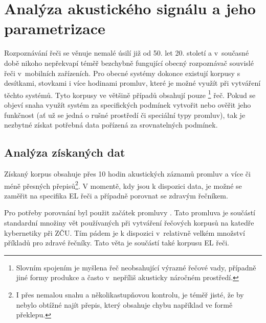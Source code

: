 \section{Analýza akustického signálu a jeho parametrizace}
\label{chap:construction:analysis}

Rozpoznávání řeči se věnuje nemalé úsilí již od 50. let 20. století a v~současné době nikoho nepřekvapí téměř bezchybně fungující obecný rozpoznávač souvislé řeči v~mobilních zařízeních.
Pro obecné systémy dokonce existují korpusy s desítkami, stovkami i více hodinami promluv, které je možné využít při vytváření těchto systémů.
Tyto korpusy ve většině případů obsahují pouze \footnote{Slovním spojením  je myšlena řeč neobsahující výrazné řečové vady, případně jiné formy produkce a často v~nepříliš akusticky náročném prostředí.} řeč.
Pokud se objeví snaha využít systém za specifických podmínek vytvořit nebo ověřit jeho funkčnost (ať už se jedná o rušné prostředí či speciální typy promluv), tak je nezbytné získat potřebná data pořízená za srovnatelných podmínek.

\subsection{Analýza získaných dat}
\label{chap:construction:analysis:data}

Získaný korpus obsahuje přes 10 hodin akustických záznamů promluv a více či méně přesných přepisů\footnote{I přes nemalou snahu a několikastupňovou kontrolu, je téměř jisté, že by nebylo obtížné najít přepis, který obsahuje chybu například ve formě překlepu.}.
V momentě, kdy jsou k dispozici data, je možné se zaměřit na specifika EL řeči a případně porovnat se zdravým řečníkem.

Pro potřeby porovnání byl použit začátek promluvy \textit{}.
Tato promluva je součástí standardní množiny vět používaných při vytváření řečových korpusů na katedře kybernetiky při ZČU.
Tím pádem je k dispozici v~relativně velkém množství příkladů pro zdravé řečníky. Tato věta je součástí také korpusu EL řeči.

